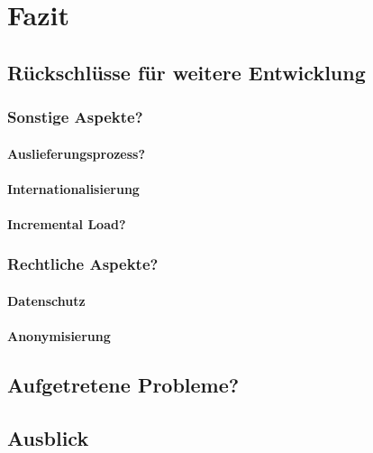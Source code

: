 \chapter{Fazit}
\label{fazit}
\minitoc\pagebreak


\section{Rückschlüsse für weitere Entwicklung}

\subsection{Sonstige Aspekte?}
\subsubsection{Auslieferungsprozess?}
\subsubsection{Internationalisierung}
\subsubsection{Incremental Load?}
\label{sub:incremental}

\subsection{Rechtliche Aspekte?}
\label{sub:recht}
\subsubsection{Datenschutz}
\subsubsection{Anonymisierung}

\section{Aufgetretene Probleme?}


\section{Ausblick}
